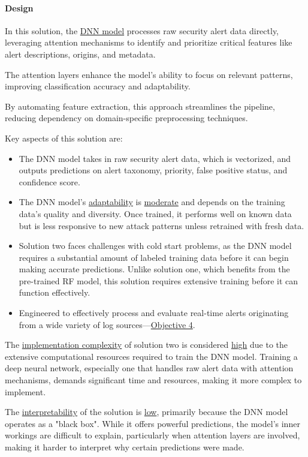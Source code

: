 \paragraph{Design}

In this solution, the \underline{DNN model} processes raw security alert data directly, leveraging attention mechanisms to identify and prioritize critical features like alert descriptions, origins, and metadata. 

The attention layers enhance the model's ability to focus on relevant patterns, improving classification accuracy and adaptability. 

By automating feature extraction, this approach streamlines the pipeline, reducing dependency on domain-specific preprocessing techniques.

Key aspects of this solution are:
\begin{itemize}
    \item The DNN model takes in raw security alert data, which is vectorized, and outputs predictions on alert taxonomy, priority, false positive status, and confidence score.
    \item The DNN model's \underline{adaptability} is \underline{moderate} and depends on the training data's quality and diversity. Once trained, it performs well on known data but is less responsive to new attack patterns unless retrained with fresh data.
    \item Solution two faces challenges with cold start problems, as the DNN model requires a substantial amount of labeled training data before it can begin making accurate predictions. Unlike solution one, which benefits from the pre-trained RF model, this solution requires extensive training before it can function effectively.
    \item Engineered to effectively process and evaluate real-time alerts originating from a wide variety of log sources—\hyperref[objective4]{Objective 4}.
\end{itemize}

The \underline{implementation complexity} of solution two is considered \underline{high} due to the extensive computational resources required to train the DNN model. 
Training a deep neural network, especially one that handles raw alert data with attention mechanisms, demands significant time and resources, making it more complex to implement.

The \underline{interpretability} of the solution is \underline{low}, primarily because the DNN model operates as a "black box". 
While it offers powerful predictions, the model's inner workings are difficult to explain, particularly when attention layers are involved, making it harder to interpret why certain predictions were made.

